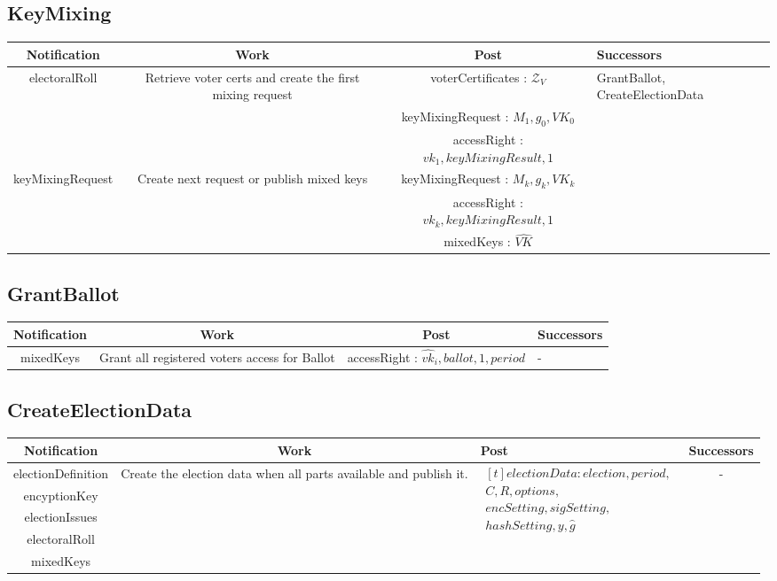 \documentclass[bibtotoc,halfparskip,oneside]{scrreprt}
\newcommand{\descrElection}{\mathit{election}\xspace}
\newcommand{\descrOptions}{\mathit{options}\xspace}
\newcommand{\period}{\mathit{period}\xspace}
\begin{document}
\begin{landscape}
		\subsection{KeyMixing}
		\begin{tabularx}{\linewidth}{|c|c|c|X|}
			\hline Notification & Work & Post & Successors\\
			\hline electoralRoll & Retrieve voter certs and create the first mixing request & voterCertificates : $\mathcal{Z}_V$ & \multirow{6}{*}{GrantBallot, CreateElectionData} \\ 
			& & keyMixingRequest : $M_1,g_0, VK_0 $ &   \\ 
			& & accessRight : $vk_1, keyMixingResult , 1 $ & \\ \cline{1-3}
			keyMixingRequest & Create next request or publish mixed keys & keyMixingRequest : $M_k,g_k, VK_k $ & \\ 
			& & accessRight : $vk_k, keyMixingResult , 1 $ & \\
			& & mixedKeys : $\hat{\mathit{VK}}$ &  \\
			\hline 
		\end{tabularx}
		
		\subsection{GrantBallot}
		\begin{tabularx}{\linewidth}{|c|c|c|X|}
			\hline Notification & Work & Post & Successors\\
			\hline mixedKeys & Grant all registered voters access for Ballot & accessRight : $\hat{vk}_i, ballot,1, period$ & - \\ 
			\hline 
		\end{tabularx}
		
		\subsection{CreateElectionData}
		\begin{tabularx}{\linewidth}{|c|c|X|c|}
			\hline Notification & Work & Post & Successors\\
			\hline electionDefinition & \multirow{5}{*}{Create the election data when all parts available and publish it.} & \multirow{5}{*}{$\begin{aligned}[t]\mathit{electionData}:\descrElection, \period,\\ C, R, \descrOptions,\\ \mathit{encSetting},\mathit{sigSetting},\\ \mathit{hashSetting},y, \hat{g}\end{aligned}$ } & \multirow{5}{*}{-} \\ 
			encyptionKey &&& \\
			electionIssues &&& \\
			electoralRoll &&& \\
			mixedKeys &&& \\
			\hline 
		\end{tabularx}
		

\end{landscape}
\end{document}
